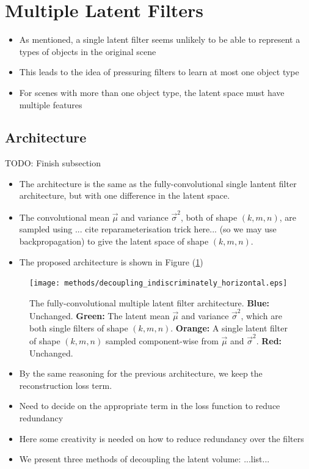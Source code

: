%
%
%
%
%
\section{Multiple Latent Filters}
\begin{itemize}
\item As mentioned, a single latent filter seems unlikely to be able to represent a types of objects in the original scene
\item This leads to the idea of pressuring filters to learn at most one object type
\item For scenes with more than one object type, the latent space must have multiple features
\end{itemize}
%
%
\subsection{Architecture}
TODO: Finish subsection

\begin{itemize}
\item The architecture is the same as the fully-convolutional single lantent filter architecture, but with one difference in the latent space.
\item The convolutional mean $\vec{\mu}$ and variance $\vec{\sigma}^2$, both of shape $(k, m, n)$, are sampled using ... cite reparameterisation trick here... (so we may use backpropagation) to give the latent space of shape $(k, m, n)$. 
\item The proposed architecture is shown in Figure (\ref{fig:decoupling_indiscriminately_horizontal})
\end{itemize}

\begin{figure}[h!]
\centering
\captionsetup{justification=centering}
\texttt{[image: methods/decoupling\_indiscriminately\_horizontal.eps]}
\caption{The fully-convolutional multiple latent filter architecture. \textbf{Blue:} Unchanged. \textbf{Green:} The latent mean $\vec{\mu}$ and variance $\vec{\sigma}^2$, which are both single filters of shape $(k, m, n)$. \textbf{Orange:} A single latent filter of shape $(k, m, n)$ sampled component-wise from $\vec{\mu}$ and $\vec{\sigma}^2$. \textbf{Red:} Unchanged.}
\label{fig:decoupling_indiscriminately_horizontal}
\end{figure}


\begin{itemize}
\item By the same reasoning for the previous architecture, we keep the reconstruction loss term. 
\item Need to decide on the appropriate term in the loss function to reduce redundancy
\item Here some creativity is needed on how to reduce redundancy over the filters
\item We present three methods of decoupling the latent volume: ...list...
\end{itemize}

